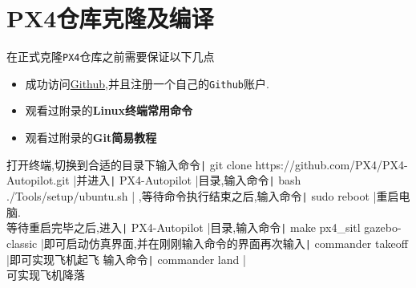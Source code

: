 \documentclass{article}
\newcommand\mintbash[1]{\texttt| #1 |}
\begin{document}
\section{PX4仓库克隆及编译}
在正式克隆\texttt{PX4}仓库之前需要保证以下几点
\begin{itemize}
    \item 成功访问\href{URLhttps://github.com/}{Github},并且注册一个自己的\texttt{Github}账户.
    \item 观看过附录的\textbf{Linux终端常用命令}
    \item 观看过附录的\textbf{Git简易教程}
\end{itemize}
打开终端,切换到合适的目录下输入命令\mintbash{git clone https://github.com/PX4/PX4-Autopilot.git}并进入\mintbash{ PX4-Autopilot }目录,输入命令\mintbash{bash ./Tools/setup/ubuntu.sh}
,等待命令执行结束之后,输入命令\mintbash{sudo reboot}重启电脑.
\\
等待重启完毕之后,进入\mintbash{PX4-Autopilot}目录,输入命令\mintbash{make px4_sitl gazebo-classic}即可启动仿真界面,并在刚刚输入命令的界面再次输入\mintbash{commander takeoff}即可实现飞机起飞
输入命令\mintbash{commander land}\\可实现飞机降落
\end{document}
